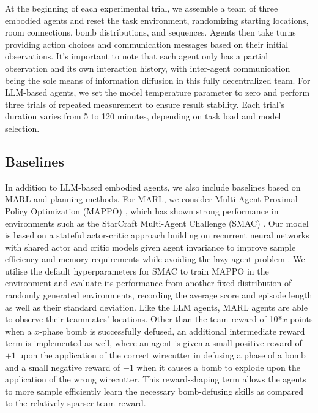 \documentclass[11pt]{article}
\begin{document}
At the beginning of each experimental trial, we assemble a team of three embodied agents and reset the task environment, randomizing starting locations, room connections, bomb distributions, and sequences. Agents then take turns providing action choices and communication messages based on their initial observations. It's important to note that each agent only has a partial observation and its own interaction history, with inter-agent communication being the sole means of information diffusion in this fully decentralized team. For LLM-based agents, we set the model temperature parameter to zero and perform three trials of repeated measurement to ensure result stability. Each trial's duration varies from 5 to 120 minutes, depending on task load and model selection.






\subsection{Baselines}
In addition to LLM-based embodied agents, we also include baselines based on MARL and planning methods. For MARL, we consider Multi-Agent Proximal Policy Optimization (MAPPO) \cite{yu2022surprising}, which has shown strong performance in environments such as the StarCraft Multi-Agent Challenge (SMAC) \cite{samvelyan19smac}. Our model is based on a stateful actor-critic approach building on recurrent neural networks with shared actor and critic models given agent invariance to improve sample efficiency and memory requirements while avoiding the lazy agent problem \cite{sunehag2017value}. We utilise the default hyperparameters for SMAC to train MAPPO in the environment and evaluate its performance from another fixed distribution of randomly generated environments, recording the average score and episode length as well as their standard deviation. Like the LLM agents, MARL agents are able to observe their teammates' locations. Other than the team reward of 10*$x$ points when a $x$-phase bomb is successfully defused, an additional intermediate reward term is implemented as well, where an agent is given a small positive reward of $+1$ upon the application of the correct wirecutter in defusing a phase of a bomb and a small negative reward of $-1$ when it causes a bomb to explode upon the application of the wrong wirecutter. This reward-shaping term allows the agents to more sample efficiently learn the necessary bomb-defusing skills as compared to the relatively sparser team reward.
\end{document}

